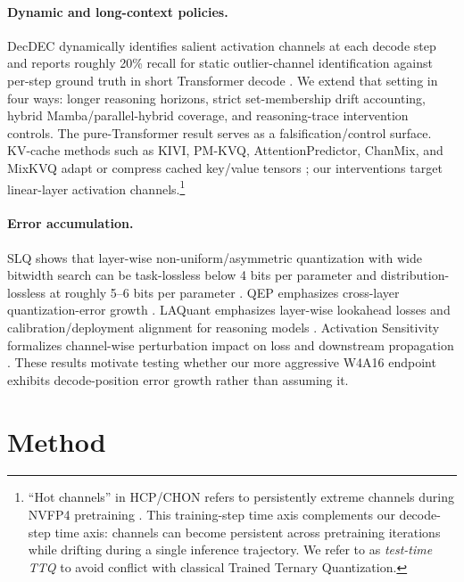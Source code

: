 \documentclass{article}
\begin{document}
\paragraph{Dynamic and long-context policies.} DecDEC dynamically identifies salient activation channels at each decode step and reports roughly 20\% recall for static outlier-channel identification against per-step ground truth in short Transformer decode \citep{park2025decdec}. We extend that setting in four ways: longer reasoning horizons, strict set-membership drift accounting, hybrid Mamba/parallel-hybrid coverage, and reasoning-trace intervention controls. The pure-Transformer result serves as a falsification/control surface. KV-cache methods such as KIVI, PM-KVQ, AttentionPredictor, ChanMix, and MixKVQ adapt or compress cached key/value tensors \citep{liu2024kivi,liu2025pmkvq,yang2025attentionpredictor,liao2026chanmix,zhang2025mixkvq}; our interventions target linear-layer activation channels.\footnote{``Hot channels'' in HCP/CHON refers to persistently extreme channels during NVFP4 pretraining \citep{dong2026outlierdynamics}. This training-step time axis complements our decode-step time axis: channels can become persistent across pretraining iterations while drifting during a single inference trajectory. We refer to \citet{koikeakino2026ttq} as \emph{test-time TTQ} to avoid conflict with classical Trained Ternary Quantization.}

\paragraph{Error accumulation.} SLQ shows that layer-wise non-uniform/asymmetric quantization with wide bitwidth search can be task-lossless below 4 bits per parameter and distribution-lossless at roughly 5--6 bits per parameter \citep{helcig2026slq}. QEP emphasizes cross-layer quantization-error growth \citep{arai2025qep}. LAQuant emphasizes layer-wise lookahead losses and calibration/deployment alignment for reasoning models \citep{choi2026laquant}. Activation Sensitivity formalizes channel-wise perturbation impact on loss and downstream propagation \citep{xu2026activationsensitivity}. These results motivate testing whether our more aggressive W4A16 endpoint exhibits decode-position error growth rather than assuming it.

\section{Method}
\end{document}
